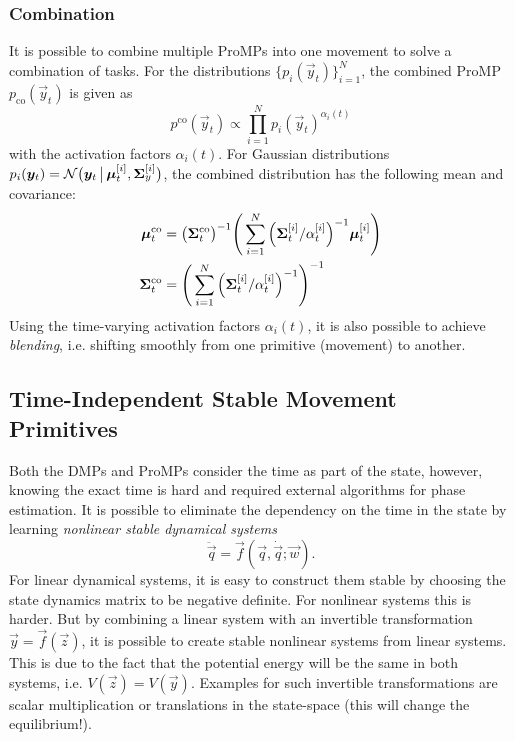 			\subsubsection{Combination}
				It is possible to combine multiple ProMPs into one movement to solve a combination of tasks. For the distributions \( \{ p_i(\vec{y}_t) \}_{i = 1}^{N} \), the combined ProMP \( p_\mathrm{co}(\vec{y}_t) \) is given as
				\begin{equation*}
					p^\mathrm{co}(\vec{y}_t) \propto \prod_{i = 1}^{N} p_i(\vec{y}_t)^{\alpha_i(t)}
				\end{equation*}
				with the activation factors \( \alpha_i(t) \). For Gaussian distributions \( p_i(\bm{y}_t) = \mathcal{N}\big( \bm{y}_t \,\big\vert\, \bm{\mu}_t^{[i]}, \bm{\Sigma}_y^{[i]} \big) \), the combined distribution has the following mean and covariance:
				\begin{align*}
					\bm{\mu}_t^\mathrm{co}    & = \big( \bm{\Sigma}_t^\mathrm{co} \big)^{-1} \Bigg( \sum_{i = 1}^{N} \Big( \bm{\Sigma}_t^{[i]} / \alpha_t^{[i]} \Big)^{-1} \bm{\mu}_t^{[i]} \Bigg) \\
					\bm{\Sigma}_t^\mathrm{co} & = \Bigg( \sum_{i = 1}^{N} \Big( \bm{\Sigma}_t^{[i]} / \alpha_t^{[i]} \Big)^{-1} \Bigg)^{-1}
				\end{align*}
				Using the time-varying activation factors \( \alpha_i(t) \), it is also possible to achieve \emph{blending}, i.e. shifting smoothly from one primitive (movement) to another.

		\subsection{Time-Independent Stable Movement Primitives}
			Both the DMPs and ProMPs consider the time as part of the state, however, knowing the exact time is hard and required external algorithms for phase estimation. It is possible to eliminate the dependency on the time in the state by learning \emph{nonlinear stable dynamical systems}
			\begin{equation*}
				\ddot{\vec{q}} = \vec{f}(\vec{q}, \dot{\vec{q}}; \vec{w}).
			\end{equation*}
			For linear dynamical systems, it is easy to construct them stable by choosing the state dynamics matrix to be negative definite. For nonlinear systems this is harder. But by combining a linear system with an invertible transformation \( \vec{y} = \vec{f}(\vec{z}) \), it is possible to create stable nonlinear systems from linear systems. This is due to the fact that the potential energy will be the same in both systems, i.e. \( V(\vec{z}) = V(\vec{y}) \). Examples for such invertible transformations are scalar multiplication or translations in the state-space (this will change the equilibrium!).


